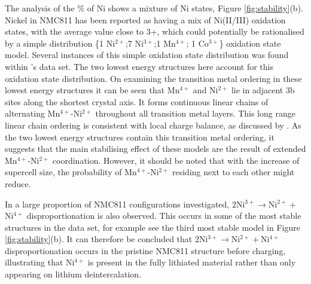 \documentclass[journal=jacsat,manuscript=article]{achemso}
\begin{document}
The analysis of the \% of Ni shows a mixture of Ni states, Figure \ref{fig:stability}(b). Nickel in NMC811 has been reported as having a mix of Ni(II/III) oxidation states, with the average value close to 3+, \cite{Zhu_JMatChemA2019,Kondrakov_JPhysChemC2017} which could potentially be rationalised by a simple distribution \{1 Ni$^{2+}$;7 Ni$^{3+}$;1 Mn$^{4+}$; 1 Co$^{3+}$\} oxidation state model. Several instances of this simple oxidation state distribution was found within \citeauthor{rana}'s data set. The two lowest energy structures here account for this oxidation state distribution. On examining the transition metal ordering in these lowest energy structures it can be seen that Mn$^{4+}$ and Ni$^{2+}$ lie in adjacent 3b sites along the shortest crystal axis. It forms continuous linear chains of alternating Mn$^{4+}$-Ni$^{2+}$ throughout all transition metal layers. This long range linear chain ordering is consistent with local charge balance, as discussed by \citeauthor{Zeng_ChemMater2007} \cite{Zeng_ChemMater2007}. As the two lowest energy structures contain this transition metal ordering, it suggests that the main stabilising effect of these models are the result of extended Mn$^{4+}$-Ni$^{2+}$ coordination. However, it should be noted that with the increase of supercell size, the probability of Mn$^{4+}$-Ni$^{2+}$ residing next to each other might reduce.

In a large proportion of NMC811 configurations \citeauthor{rana} investigated, $2$Ni$^{3+}\rightarrow$Ni$^{2+} + $Ni$^{4+}$ disproportionation is also observed. This occurs in some of the most stable structures in the data set, for example see the third most stable model in Figure \ref{fig:stability}(b). It can therefore be concluded that $2$Ni$^{3+}\rightarrow$Ni$^{2+} + $Ni$^{4+}$ disproportionation occurs in the pristine NMC811 structure before charging, illustrating that Ni$^{4+}$ is present in the fully lithiated material rather than only appearing on lithium deintercalation.

\end{document}
